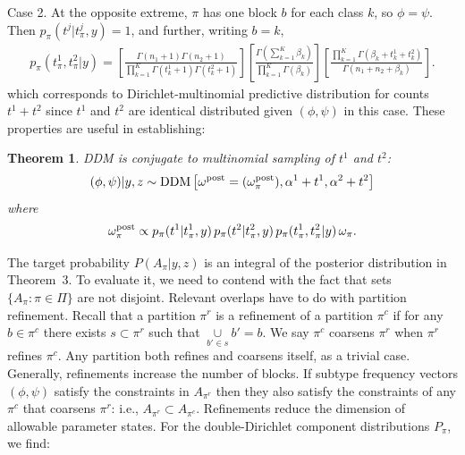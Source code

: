 \documentclass[aoas,preprint]{imsart}
\newtheorem{theorem}{Theorem}
\begin{document}
Case 2. At the opposite extreme, $\pi$  has one block $b$ for each
 class $k$, so $\phi=\psi$. Then $p_\pi(t^j | t^j_{\pi},y) = 1$, and 
further, writing $b = k$,
\begin{eqnarray*}
p_\pi(t^1_{\pi},t^2_{\pi}|y ) =
 \left[ \frac{ \Gamma(n_1+1) \Gamma(n_2+1) }{ \prod_{k=1}^K 
   \Gamma(t^1_k+1) 
   \Gamma( t^2_k + 1 )} \right] 
\left[ \frac{\Gamma( \sum_{k=1}^K \beta_k  )}{
   \prod_{k=1}^K \Gamma(\beta_k)} \right] 
 \left[ \frac{ \prod_{k=1}^K \Gamma( \beta_k + t^1_k + t^2_k )}{
	\Gamma( n_1 + n_2 + \beta_k  )} \right].
\end{eqnarray*}
which corresponds to Dirichlet-multinomial predictive distribution for counts $t^1 + t^2$ 
since $t^1$ and $t^2$ are identical distributed given $(\phi,\psi)$ in this case.  These properties 
are useful in establishing:
\begin{theorem}
DDM is conjugate to multinomial sampling of $t^1$ and $t^2$:
\begin{eqnarray*}
(\phi,\psi)|y,z  \sim {\mbox {\rm DDM}}\left[ \omega^{\rm post}=(\omega^{\rm post}_\pi), \alpha^1 + t^1, \alpha^2 + t^2  \right]
\end{eqnarray*}
where
\begin{eqnarray}
\label{eq:postmix}
\omega^{\rm post}_\pi \propto 
 p_\pi(t^1 | t^1_{\pi},y)\, p_\pi(t^2|  t^2_{\pi},y )
 \, p_\pi( t^1_{\pi}, t^2_{\pi} | y ) \, \omega_\pi.
\end{eqnarray}

\end{theorem}


The target probability $P(A_\pi|y,z)$ is an integral of the posterior distribution in Theorem~3.
To evaluate it, we need to contend with the fact that sets $\{ A_\pi: \pi \in \Pi \}$ are not disjoint.
Relevant overlaps have to do with partition refinement.  Recall 
that a  partition $\pi^r$ is a refinement of a partition $\pi^c$ if for any $b \in \pi^c$ there 
exists $s \subset \pi^r$  such that $\underset{b'\in s}\cup b' = b$. 
We say $\pi^c$  coarsens $\pi^r$ when $\pi^r$ refines $\pi^c$. Any partition both
refines and coarsens itself, as a trivial case. 
Generally, refinements increase the number of blocks.
 If subtype frequency vectors $(\phi,\psi)$
satisfy the constraints in $A_{\pi^r}$ then they also satisfy the constraints of any $\pi^c$
that coarsens $\pi^r$: i.e., $A_{\pi^r} \subset A_{\pi^c}$.  
Refinements reduce the dimension of allowable parameter states. 
 For the double-Dirichlet
component distributions $P_\pi$, we find:
\end{document}
